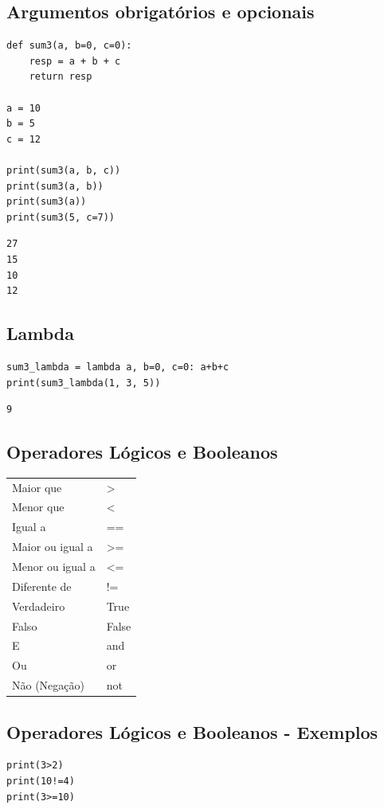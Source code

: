 \documentclass[presentation]{beamer}
\begin{document}
\subsection{Argumentos obrigatórios e opcionais}
\label{sec:orgheadline69}
\begin{verbatim}
def sum3(a, b=0, c=0):
    resp = a + b + c
    return resp

a = 10
b = 5
c = 12

print(sum3(a, b, c))
print(sum3(a, b))
print(sum3(a))
print(sum3(5, c=7))
\end{verbatim}

\begin{verbatim}
27
15
10
12
\end{verbatim}

\subsection{Lambda}
\label{sec:orgheadline70}
\begin{verbatim}
sum3_lambda = lambda a, b=0, c=0: a+b+c
print(sum3_lambda(1, 3, 5))
\end{verbatim}

\begin{verbatim}
9
\end{verbatim}
\subsection{Operadores Lógicos e Booleanos}
\label{sec:orgheadline71}
\begin{center}
\begin{tabular}{ll}
Maior que & >\\
Menor que & <\\
Igual a & ==\\
Maior ou igual a & >=\\
Menor ou igual a & <=\\
Diferente de & !=\\
Verdadeiro & True\\
Falso & False\\
E & and\\
Ou & or\\
Não (Negação) & not\\
\end{tabular}
\end{center}


\subsection{Operadores Lógicos e Booleanos - Exemplos}
\label{sec:orgheadline72}
\begin{verbatim}
print(3>2)
print(10!=4)
print(3>=10)
\end{verbatim}
\end{document}
